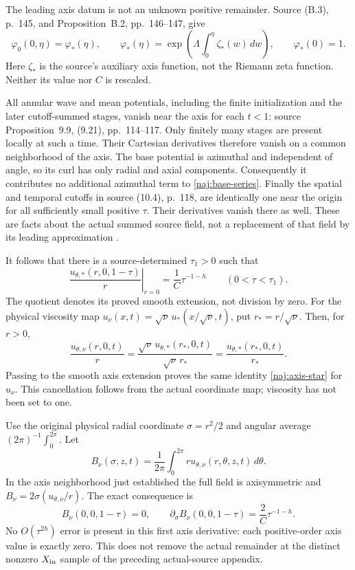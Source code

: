 The leading axis datum is not an unknown positive remainder. Source
(B.3), p.~145, and Proposition~B.2, pp.~146--147, give
\[
 \varphi_0(0,\eta)=\varphi_*(\eta),\qquad
 \varphi_*(\eta)=
  \exp\left(\Lambda\int_0^\eta\zeta_*(w)\,dw\right),\qquad
 \varphi_*(0)=1.
\]
Here \(\zeta_*\) is the source's auxiliary axis function, not the
Riemann zeta function. Neither its value nor \(C\) is rescaled.

All annular wave and mean potentials, including the finite
initialization and the later cutoff-summed stages, vanish near the axis
for each \(t<1\): source Proposition~9.9, (9.21), pp.~114--117.
Only finitely many stages are present locally at such a time. Their
Cartesian derivatives therefore vanish on a common neighborhood of the
axis. The base potential is azimuthal and independent of angle, so its
curl has only radial and axial components. Consequently it contributes
no additional azimuthal term to \eqref{naj:base-series}.
Finally the spatial and temporal cutoffs in source (10.4), p.~118,
are identically one near the origin for all sufficiently small
positive \(\tau\). Their derivatives vanish there as well.
These are facts about the actual summed source field, not a
replacement of that field by its leading approximation
\cite[Lemma 5.1; Proposition 5.5; (9.21); (10.4); (B.3)]{openaiNS2026}.

It follows that there is a source-determined \(\tau_1>0\) such that
\begin{equation}\label{naj:axis-star}
 \left.\frac{u_{\theta,*}(r,0,1-\tau)}r\right|_{r=0}
       =\frac1C\tau^{-1-h}\qquad(0<\tau<\tau_1).
\end{equation}
The quotient denotes its proved smooth extension, not division by
zero. For the physical viscosity map
\(u_\nu(x,t)=\sqrt\nu\,u_*(x/\sqrt\nu,t)\), put
\(r_*=r/\sqrt\nu\). Then, for \(r>0\),
\[
 \frac{u_{\theta,\nu}(r,0,t)}r
 =\frac{\sqrt\nu\,u_{\theta,*}(r_*,0,t)}{\sqrt\nu\,r_*}
 =\frac{u_{\theta,*}(r_*,0,t)}{r_*}.
\]
Passing to the smooth axis extension proves the same identity
\eqref{naj:axis-star} for \(u_\nu\). This cancellation follows from the
actual coordinate map; viscosity has not been set to one.

Use the original physical radial coordinate
\(\sigma=r^2/2\) and angular average \( (2\pi)^{-1}\int_0^{2\pi}\).
Let
\[
 B_\nu(\sigma,z,t)=
    \frac1{2\pi}\int_0^{2\pi} r u_{\theta,\nu}(r,\theta,z,t)\,d\theta .
\]
In the axis neighborhood just established the full field is
axisymmetric and \(B_\nu=2\sigma(u_{\theta,\nu}/r)\).
The exact consequence is
\begin{equation}\label{naj:B-axis}
 B_\nu(0,0,1-\tau)=0,\qquad
 \partial_\sigma B_\nu(0,0,1-\tau)=\frac2C\tau^{-1-h}.
\end{equation}
No \(O(\tau^{2h})\) error is present in this first axis derivative:
each positive-order axis value is exactly zero. This does not remove
the actual remainder at the distinct nonzero \(X_{\rm in}\) sample
of the preceding actual-source appendix.

